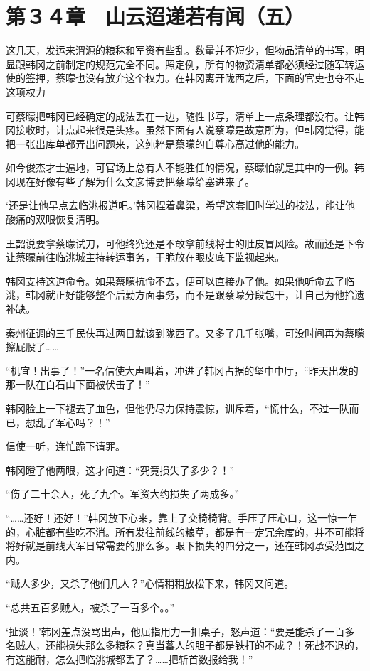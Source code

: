 \section{第３４章　山云迢递若有闻（五）}

这几天，发运来渭源的粮秣和军资有些乱。数量并不短少，但物品清单的书写，明显跟韩冈之前制定的规范完全不同。照定例，所有的物资清单都必须经过随军转运使的签押，蔡曚也没有放弃这个权力。在韩冈离开陇西之后，下面的官吏也夺不走这项权力

可蔡曚把韩冈已经确定的成法丢在一边，随性书写，清单上一点条理都没有。让韩冈接收时，计点起来很是头疼。虽然下面有人说蔡曚是故意所为，但韩冈觉得，能把一张出库单都弄出问题来，这纯粹是蔡曚的自尊心高过他的能力。

如今俊杰才士遍地，可官场上总有人不能胜任的情况，蔡曚怕就是其中的一例。韩冈现在好像有些了解为什么文彦博要把蔡曚给塞进来了。

‘还是让他早点去临洮报道吧。’韩冈捏着鼻梁，希望这套旧时学过的技法，能让他酸痛的双眼恢复清明。

王韶说要拿蔡曚试刀，可他终究还是不敢拿前线将士的肚皮冒风险。故而还是下令让蔡曚前往临洮城主持转运事务，干脆放在眼皮底下监视起来。

韩冈支持这道命令。如果蔡曚抗命不去，便可以直接办了他。如果他听命去了临洮，韩冈就正好能够整个后勤方面事务，而不是跟蔡曚分段包干，让自己为他拾遗补缺。

秦州征调的三千民伕再过两日就该到陇西了。又多了几千张嘴，可没时间再为蔡曚擦屁股了……

“机宜！出事了！”一名信使大声叫着，冲进了韩冈占据的堡中中厅，“昨天出发的那一队在白石山下面被伏击了！”

韩冈脸上一下褪去了血色，但他仍尽力保持震惊，训斥着，“慌什么，不过一队而已，想乱了军心吗？！”

信使一听，连忙跪下请罪。

韩冈瞪了他两眼，这才问道：“究竟损失了多少？！”

“伤了二十余人，死了九个。军资大约损失了两成多。”

“……还好！还好！”韩冈放下心来，靠上了交椅椅背。手压了压心口，这一惊一乍的，心脏都有些吃不消。所有发往前线的粮草，都是有一定冗余度的，并不可能将将好就是前线大军日常需要的那么多。眼下损失的四分之一，还在韩冈承受范围之内。

“贼人多少，又杀了他们几人？”心情稍稍放松下来，韩冈又问道。

“总共五百多贼人，被杀了一百多个。。”

‘扯淡！’韩冈差点没骂出声，他屈指用力一扣桌子，怒声道：“要是能杀了一百多名贼人，还能损失那么多粮秣？真当蕃人的胆子都是铁打的不成？！死战不退的，有这能耐，怎么把临洮城都丢了？……把斩首数报给我！”

